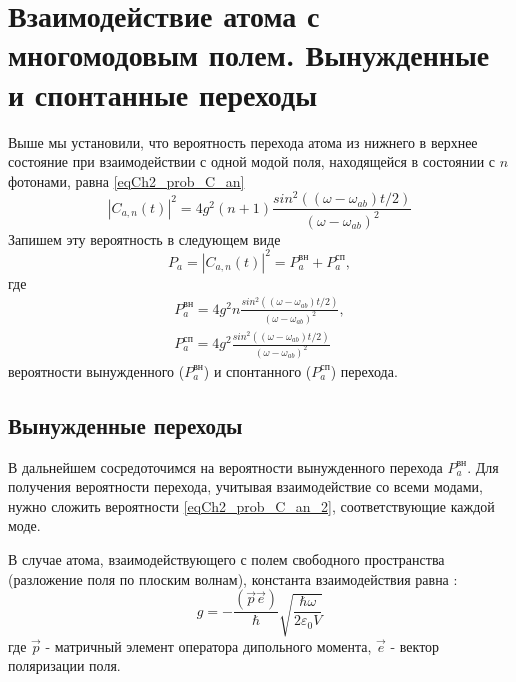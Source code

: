 \section{Взаимодействие атома с многомодовым полем. Вынужденные и
  спонтанные переходы}
Выше мы установили, что вероятность перехода атома из нижнего в
верхнее состояние при взаимодействии с одной модой поля, находящейся в
состоянии с $n$ фотонами, равна \eqref{eqCh2_prob_C_an} 
\begin{equation}
\left|C_{a,n}\left(t\right)\right|^2 = 4 g^2 \left(n+1\right)
  \frac{sin^2\left(\left(\omega - 
  \omega_{ab}\right)t/2\right)} {\left(\omega - 
  \omega_{ab}\right)^2}
  \nonumber
\end{equation}
Запишем эту вероятность в следующем виде
\begin{equation}
  P_a = \left|C_{a,n}\left(t\right)\right|^2 =
  P_a^{\mbox{вн}} + P_a^{\mbox{сп}},
  \label{eqCh2_prob_C_an_2_1}
\end{equation}
где
\begin{eqnarray}
  P_a^{\mbox{вн}} = 4 g^2 n
  \frac{sin^2\left(\left(\omega - 
  \omega_{ab}\right)t/2\right)} {\left(\omega - 
    \omega_{ab}\right)^2},
  \nonumber \\
  P_a^{\mbox{сп}} = 4 g^2 
  \frac{sin^2\left(\left(\omega - 
  \omega_{ab}\right)t/2\right)} {\left(\omega - 
  \omega_{ab}\right)^2}
  \label{eqCh2_prob_C_an_2}
\end{eqnarray}
вероятности вынужденного ($P_a^{\mbox{вн}}$)
и спонтанного ($P_a^{\mbox{сп}}$) перехода.

\subsection{Вынужденные переходы}
В дальнейшем сосредоточимся на вероятности вынужденного перехода
$P_a^{\mbox{вн}}$.
Для получения вероятности перехода, учитывая взаимодействие со всеми
модами, нужно сложить вероятности \eqref{eqCh2_prob_C_an_2},
соответствующие каждой моде. 

В случае атома, взаимодействующего с полем свободного пространства
(разложение поля по плоским волнам), константа взаимодействия равна
\cite{bLuisell1972}: 
\begin{equation}
g = - \frac{\left(\vec{p}\vec{e}\right)}{\hbar}
\sqrt{\frac{\hbar \omega}{2 \varepsilon_0 V}}
\end{equation}
где $\vec{p}$ - матричный элемент оператора дипольного момента,
$\vec{e}$ - вектор поляризации поля. 

